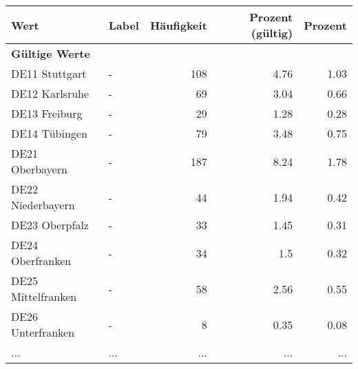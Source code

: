      \begin{longtable}{Xlrrr}
     \toprule
     \textbf{Wert} & \textbf{Label} & \textbf{Häufigkeit} & \textbf{Prozent (gültig)} & \textbf{Prozent} \\
     \endhead
     \midrule
     \multicolumn{5}{l}{\textbf{Gültige Werte}}\\
        \multicolumn{1}{X}{DE11 Stuttgart} & - & \num{108} & \num[round-mode=places,round-precision=2]{4.76} & \num[round-mode=places,round-precision=2]{1.03} \\
        \multicolumn{1}{X}{DE12 Karlsruhe} & - & \num{69} & \num[round-mode=places,round-precision=2]{3.04} & \num[round-mode=places,round-precision=2]{0.66} \\
        \multicolumn{1}{X}{DE13 Freiburg} & - & \num{29} & \num[round-mode=places,round-precision=2]{1.28} & \num[round-mode=places,round-precision=2]{0.28} \\
        \multicolumn{1}{X}{DE14 Tübingen} & - & \num{79} & \num[round-mode=places,round-precision=2]{3.48} & \num[round-mode=places,round-precision=2]{0.75} \\
        \multicolumn{1}{X}{DE21 Oberbayern} & - & \num{187} & \num[round-mode=places,round-precision=2]{8.24} & \num[round-mode=places,round-precision=2]{1.78} \\
        \multicolumn{1}{X}{DE22 Niederbayern} & - & \num{44} & \num[round-mode=places,round-precision=2]{1.94} & \num[round-mode=places,round-precision=2]{0.42} \\
        \multicolumn{1}{X}{DE23 Oberpfalz} & - & \num{33} & \num[round-mode=places,round-precision=2]{1.45} & \num[round-mode=places,round-precision=2]{0.31} \\
        \multicolumn{1}{X}{DE24 Oberfranken} & - & \num{34} & \num[round-mode=places,round-precision=2]{1.5} & \num[round-mode=places,round-precision=2]{0.32} \\
        \multicolumn{1}{X}{DE25 Mittelfranken} & - & \num{58} & \num[round-mode=places,round-precision=2]{2.56} & \num[round-mode=places,round-precision=2]{0.55} \\
        \multicolumn{1}{X}{DE26 Unterfranken} & - & \num{8} & \num[round-mode=places,round-precision=2]{0.35} & \num[round-mode=places,round-precision=2]{0.08} \\
       ... & ... & ... & ... & ... \\

\end{longtable}
